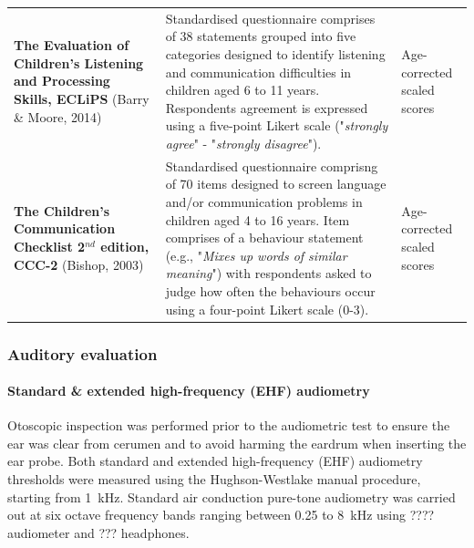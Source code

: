 \documentclass[a4paper, twoside]{templates/ociamthesis}
\begin{document}
\begin{table}
{\begin{tabular}[t]{>{\raggedright\arraybackslash}p{12em}>{\raggedright\arraybackslash}p{24em}>{\raggedright\arraybackslash}p{10em}}
\addlinespace
\textbf{The Evaluation of Children's Listening and Processing Skills, ECLiPS} (Barry \& Moore, 2014) & Standardised questionnaire comprises of 38  statements grouped into five categories designed to identify listening and communication difficulties in children aged 6 to 11 years. Respondents agreement is expressed using a five-point Likert scale ("\textit{strongly agree}" - "\textit{strongly disagree}"). & Age-corrected scaled scores\\
\addlinespace
\textbf{The Children's Communication Checklist 2$^{nd}$ edition, CCC-2} (Bishop, 2003) & Standardised questionnaire comprisng of 70 items designed to screen language and/or communication problems in children aged 4 to 16 years. Item comprises of a behaviour statement (e.g., "\textit{Mixes up words of similar meaning}") with respondents asked to judge how often the behaviours occur using a four-point Likert scale (0-3). & Age-corrected scaled scores\\
\bottomrule
\end{tabular}}
\end{table}

\hypertarget{auditory-evaluation}{%
\subsubsection{Auditory evaluation}\label{auditory-evaluation}}

\hypertarget{standard-extended-high-frequency-ehf-audiometry}{%
\paragraph*{Standard \& extended high-frequency (EHF) audiometry}\label{standard-extended-high-frequency-ehf-audiometry}}

\hfill\break
Otoscopic inspection was performed prior to the audiometric test to ensure the ear was clear from cerumen and to avoid harming the eardrum when inserting the ear probe. Both standard and extended high-frequency (EHF) audiometry thresholds were measured using the Hughson-Westlake manual procedure, starting from 1~kHz. Standard air conduction pure-tone audiometry was carried out at six octave frequency bands ranging between 0.25 to 8~kHz using ???? audiometer and ??? headphones.\\
\end{document}
